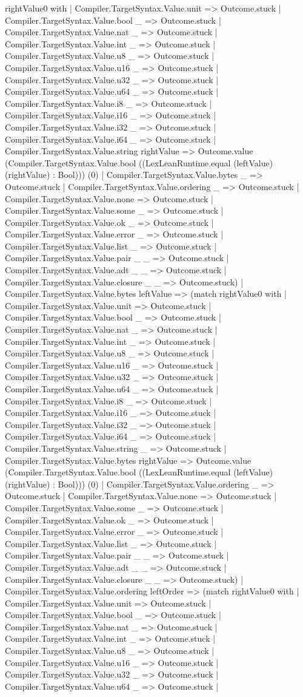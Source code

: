 \documentclass[11pt]{article}
\begin{document}
rightValue0 with | Compiler.TargetSyntax.Value.unit => Outcome.stuck | Compiler.TargetSyntax.Value.bool \_ => Outcome.stuck | Compiler.TargetSyntax.Value.nat \_ => Outcome.stuck | Compiler.TargetSyntax.Value.int \_ => Outcome.stuck | Compiler.TargetSyntax.Value.u8 \_ => Outcome.stuck | Compiler.TargetSyntax.Value.u16 \_ => Outcome.stuck | Compiler.TargetSyntax.Value.u32 \_ => Outcome.stuck | Compiler.TargetSyntax.Value.u64 \_ => Outcome.stuck | Compiler.TargetSyntax.Value.i8 \_ => Outcome.stuck | Compiler.TargetSyntax.Value.i16 \_ => Outcome.stuck | Compiler.TargetSyntax.Value.i32 \_ => Outcome.stuck | Compiler.TargetSyntax.Value.i64 \_ => Outcome.stuck | Compiler.TargetSyntax.Value.string rightValue => Outcome.value (Compiler.TargetSyntax.Value.bool ((LexLeanRuntime.equal (leftValue) (rightValue) : Bool))) (0) | Compiler.TargetSyntax.Value.bytes \_ => Outcome.stuck | Compiler.TargetSyntax.Value.ordering \_ => Outcome.stuck | Compiler.TargetSyntax.Value.none => Outcome.stuck | Compiler.TargetSyntax.Value.some \_ => Outcome.stuck | Compiler.TargetSyntax.Value.ok \_ => Outcome.stuck | Compiler.TargetSyntax.Value.error \_ => Outcome.stuck | Compiler.TargetSyntax.Value.list \_ => Outcome.stuck | Compiler.TargetSyntax.Value.pair \_ \_ => Outcome.stuck | Compiler.TargetSyntax.Value.adt \_ \_ => Outcome.stuck | Compiler.TargetSyntax.Value.closure \_ \_ => Outcome.stuck) | Compiler.TargetSyntax.Value.bytes leftValue => (match rightValue0 with | Compiler.TargetSyntax.Value.unit => Outcome.stuck | Compiler.TargetSyntax.Value.bool \_ => Outcome.stuck | Compiler.TargetSyntax.Value.nat \_ => Outcome.stuck | Compiler.TargetSyntax.Value.int \_ => Outcome.stuck | Compiler.TargetSyntax.Value.u8 \_ => Outcome.stuck | Compiler.TargetSyntax.Value.u16 \_ => Outcome.stuck | Compiler.TargetSyntax.Value.u32 \_ => Outcome.stuck | Compiler.TargetSyntax.Value.u64 \_ => Outcome.stuck | Compiler.TargetSyntax.Value.i8 \_ => Outcome.stuck | Compiler.TargetSyntax.Value.i16 \_ => Outcome.stuck | Compiler.TargetSyntax.Value.i32 \_ => Outcome.stuck | Compiler.TargetSyntax.Value.i64 \_ => Outcome.stuck | Compiler.TargetSyntax.Value.string \_ => Outcome.stuck | Compiler.TargetSyntax.Value.bytes rightValue => Outcome.value (Compiler.TargetSyntax.Value.bool ((LexLeanRuntime.equal (leftValue) (rightValue) : Bool))) (0) | Compiler.TargetSyntax.Value.ordering \_ => Outcome.stuck | Compiler.TargetSyntax.Value.none => Outcome.stuck | Compiler.TargetSyntax.Value.some \_ => Outcome.stuck | Compiler.TargetSyntax.Value.ok \_ => Outcome.stuck | Compiler.TargetSyntax.Value.error \_ => Outcome.stuck | Compiler.TargetSyntax.Value.list \_ => Outcome.stuck | Compiler.TargetSyntax.Value.pair \_ \_ => Outcome.stuck | Compiler.TargetSyntax.Value.adt \_ \_ => Outcome.stuck | Compiler.TargetSyntax.Value.closure \_ \_ => Outcome.stuck) | Compiler.TargetSyntax.Value.ordering leftOrder => (match rightValue0 with | Compiler.TargetSyntax.Value.unit => Outcome.stuck | Compiler.TargetSyntax.Value.bool \_ => Outcome.stuck | Compiler.TargetSyntax.Value.nat \_ => Outcome.stuck | Compiler.TargetSyntax.Value.int \_ => Outcome.stuck | Compiler.TargetSyntax.Value.u8 \_ => Outcome.stuck | Compiler.TargetSyntax.Value.u16 \_ => Outcome.stuck | Compiler.TargetSyntax.Value.u32 \_ => Outcome.stuck | Compiler.TargetSyntax.Value.u64 \_ => Outcome.stuck | 
\end{document}
